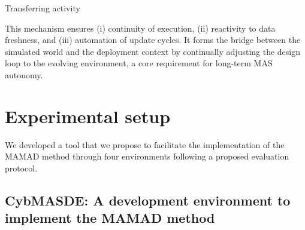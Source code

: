 \documentclass[pdflatex,sn-mathphys-num]{sn-jnl}%
\theoremstyle{thmstyleone}%
\theoremstyle{thmstyletwo}%
\theoremstyle{thmstylethree}%
\begin{document}
\vspace{-0.3em}
\begin{algorithm}[H]
    \caption{Transferring activity}
    \label{alg:transferring}
    \footnotesize
    \DontPrintSemicolon
    
    \vspace{0.3em}
\end{algorithm}

This mechanism ensures (i) continuity of execution, (ii) reactivity to data freshness, and (iii) automation of update cycles. It forms the bridge between the simulated world and the deployment context by continually adjusting the design loop to the evolving environment, a core requirement for long-term MAS autonomy.


\section{Experimental setup}
\label{sec:experimental_setup}

We developed a tool that we propose to facilitate the implementation of the MAMAD method through four environments following a proposed evaluation protocol.

\subsection{CybMASDE: A development environment to implement the MAMAD method}
\label{sec:cybmasde}
\end{document}

